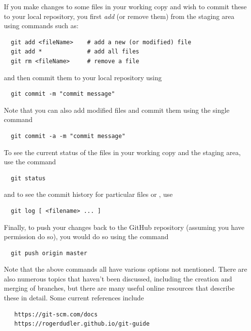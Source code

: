 If you make changes to some files in your working copy and wish to
commit these to your local repository, you first {\it add} (or remove
them) from the staging area using commands such as:
\begin{verbatim}
  git add <fileName>    # add a new (or modified) file
  git add *             # add all files
  git rm <fileName>     # remove a file
\end{verbatim}
and then commit them to your local repository using
\begin{verbatim}
  git commit -m "commit message"
\end{verbatim}
Note that you can also add modified files and commit them using the single
command
\begin{verbatim}
  git commit -a -m "commit message"
\end{verbatim}

To see the current status of the files in your working copy
and the staging area, use the command
\begin{verbatim}
  git status
\end{verbatim}
and to see the commit history for particular files or \directories{},
use 
\begin{verbatim}
  git log [ <filename> ... ]
\end{verbatim}

Finally, to push your changes back to the GitHub repository (assuming
you have permission do so), you would do so using the command
\begin{verbatim}
  git push origin master
\end{verbatim}

Note that the above commands all have various options not mentioned.
There are also numerous topics that haven't been discussed, including
the creation and merging of branches, but there are many useful online
resources that describe these in detail. Some current references
include
\begin{verbatim}
   https://git-scm.com/docs
   https://rogerdudler.github.io/git-guide
\end{verbatim}




